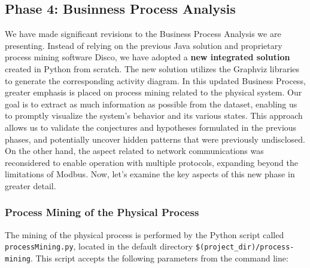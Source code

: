 \subsection{Phase 4: Businness Process Analysis}
\label{subsec:4_improve_bpa}
We have made significant revisions to the Business Process Analysis we are presenting. Instead of relying on the previous Java solution and proprietary process mining software Disco, we have adopted a \textbf{new integrated solution} created in Python from scratch. The new solution utilizes the Graphviz libraries to generate the corresponding activity diagram.\newline \newline
In this updated Business Process, greater emphasis is placed on process mining related to the physical system. Our goal is to extract as much information as possible from the dataset, enabling us to promptly visualize the system's behavior and its various states. This approach allows us to validate the conjectures and hypotheses formulated in the previous phases, and potentially uncover hidden patterns that were previously undisclosed.\newline
On the other hand, the aspect related to network communications was reconsidered to enable operation with multiple protocols, expanding beyond the limitations of Modbus.\newline \newline %
Now, let's examine the key aspects of this new phase in greater detail.

\subsubsection{Process Mining of the Physical Process}
\label{subsub:4_proc_minining_phy}

The mining of the physical process is performed by the Python script called \texttt{processMining.py}, located in the default directory \texttt{\$(project\_dir)/process-mining}.\newline
This script accepts the following parameters from the command line:

